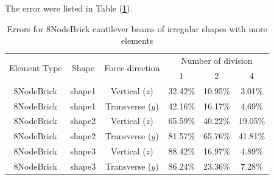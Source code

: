 \documentclass[fleqn,11pt]{article}
\begin{document}
The error were listed in Table (\ref{table Errors for 8NodeBrick cantilever beams of irregular shapes with more elements}). 

\begin{table}[H]
  \centering
  \caption{Errors for 8NodeBrick cantilever beams of irregular shapes with more elements}
  \label{table Errors for 8NodeBrick cantilever beams of irregular shapes with more elements}
\begin{tabular}{|c|c|c|c|c|c|}
\hline
\multirow{2}{*}{Element Type} & \multirow{2}{*}{Shape}  & \multirow{2}{*}{Force direction}  & \multicolumn{3}{|c|}{Number of division} \\  \cline{4-6}
                        &        &                  &  1 &  2 &  4  \\ \hline
8NodeBrick   & shape1      & Vertical ($z$)   & 32.42\% & 10.95\% & 3.01\%     \\ \hline
8NodeBrick   & shape1      & Transverse ($y$) & 42.16\% & 16.17\% & 4.69\%     \\ \hline
8NodeBrick   & shape2      & Vertical ($z$)   & 65.59\% & 40.22\% & 19.05\%    \\ \hline
8NodeBrick   & shape2      & Transverse ($y$) & 81.57\% & 65.76\% & 41.81\%    \\ \hline
8NodeBrick   & shape3      & Vertical ($z$)   & 88.42\% & 16.97\% & 4.89\%     \\ \hline
8NodeBrick   & shape3      & Transverse ($y$) & 86.24\% & 23.36\% & 7.28\%     \\
\hline
\end{tabular}
\end{table}



\end{document}
